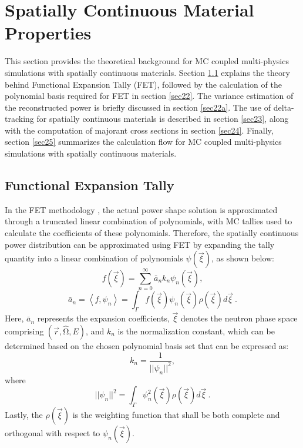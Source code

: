 \newpage 
\section{Spatially Continuous Material Properties} \label{s2}

This section provides the theoretical background for MC coupled multi-physics simulations with spatially continuous materials. Section \ref{sec21} explains the theory behind Functional Expansion Tally (FET), followed by the calculation of the polynomial basis required for FET in section \ref{sec22}. The variance estimation of the reconstructed power is briefly discussed in section \ref{sec22a}. The use of delta-tracking for spatially continuous materials is described in section \ref{sec23}, along with the computation of majorant cross sections in section \ref{sec24}. Finally, section \ref{sec25} summarizes the calculation flow for MC coupled multi-physics simulations with spatially continuous materials.

\subsection{Functional Expansion Tally} \label{sec21}

In the FET methodology \cite{gries, ellis}, the actual power shape solution is approximated through a truncated linear combination of polynomials, with MC tallies used to calculate the coefficients of these polynomials. Therefore, the spatially continuous power distribution can be approximated using FET by expanding the tally quantity into a linear combination of polynomials $\psi(\vec{\xi})$, as shown below:
\begin{equation}
    f\left(\vec{\xi}\right)=\sum_{n=0}^{\infty}{{\bar{a}}_nk_n\psi_n\left(\vec{\xi}\right)},
    \label{eq1}
\end{equation}
\begin{equation}
    {\bar{a}}_n=\left\langle f,\psi_n\right\rangle=\int_{\Gamma}{f\left(\vec{\xi}\right)\psi_n\left(\vec{\xi}\right)\rho\left(\vec{\xi}\right)d\vec{\xi}\ }.
    \label{eq2}
\end{equation}
Here, ${\bar{a}}_n$ represents the expansion coefficients, $\vec{\xi}$ denotes the neutron phase space comprising $\left(\vec{r},\hat{\mathrm{\Omega}},E\right)$, and $k_n$ is the normalization constant, which can be determined based on the chosen polynomial basis set that can be expressed as:
\begin{equation}
    k_n=\frac{1}{||\psi_n||^2},
\end{equation}
where
\begin{equation}
    ||\psi_n||^2=\int_{\Gamma}{\psi_n^2\left(\vec{\xi}\right)\rho\left(\vec{\xi}\right)d}\vec{\xi}\ .
    \label{eq4}
\end{equation}
Lastly, the $\rho\left(\vec{\xi}\right)$ is the weighting function that shall be both complete and orthogonal with respect to $\psi_n\left(\vec{\xi}\right)$.

